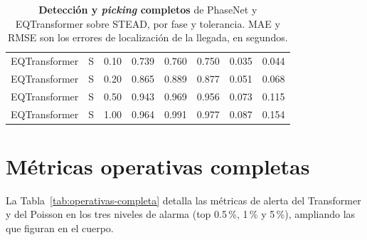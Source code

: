 \begin{table}[ht!]
\begin{tabular}{@{}llcccccc@{}}
    EQTransformer   & S             & 0.10               & 0.739              & 0.760           & 0.750       & 0.035            & 0.044             \\
    EQTransformer   & S             & 0.20               & 0.865              & 0.889           & 0.877       & 0.051            & 0.068             \\
    EQTransformer   & S             & 0.50               & 0.943              & 0.969           & 0.956       & 0.073            & 0.115             \\
    EQTransformer   & S             & 1.00               & 0.964              & 0.991           & 0.977       & 0.087            & 0.154             \\
    \bottomrule
  \end{tabular}
  \caption[Resultados completos de detección y \textit{picking}]{\textbf{Detección y \textit{picking} completos} de PhaseNet y EQTransformer sobre STEAD, por fase y tolerancia. MAE y RMSE son los errores de localización de la llegada, en segundos.}
  \label{tab:deteccion-completa}
\end{table}

\section{Métricas operativas completas}
\label{apendice-operativas}

La Tabla~\ref{tab:operativas-completa} detalla las métricas de alerta del Transformer y del Poisson
en los tres niveles de alarma (top 0.5\,\%, 1\,\% y 5\,\%), ampliando las que figuran en el cuerpo.

